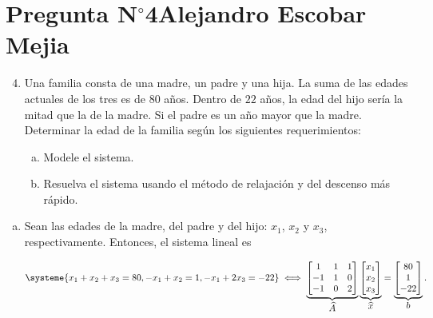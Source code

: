 \section{Pregunta N$^{\circ}$4\qquad Alejandro Escobar Mejia}

\begin{frame}
	\begin{enumerate}\setcounter{enumi}{3}
		\item

		      Una familia consta de una madre, un padre y una hija.
		      La suma de las edades actuales de los tres es de $80$ años.
		      Dentro de $22$ años, la edad del hijo sería la mitad que la
		      de la madre.
		      Si el padre es un año mayor que la madre.
		      Determinar la edad de la familia según los siguientes
		      requerimientos:

		      \begin{enumerate}[a)]
			      \item

			            Modele el sistema.

			      \item

			            Resuelva el sistema usando el método de relajación
			            y del descenso más rápido.
		      \end{enumerate}
	\end{enumerate}

	\begin{solution}
		\begin{enumerate}[a)]
			\item

			      Sean las edades de la \alert{madre}, del \alert{padre} y
			      del \alert{hijo}: \alert{$x_{1}$}, \alert{$x_{2}$} y
			      \alert{$x_{3}$}, respectivamente.
			      Entonces, el sistema lineal es

			      \begin{equation*}
				      \systeme{
				      x_{1}+x_{2}+x_{3}=80,
				      -x_{1}+x_{2}=1,
				      -x_{1}+2x_{3}=-22
				      }\iff
				      \underbrace{
					      \begin{bmatrix}
						      1  & 1 & 1 \\
						      -1 & 1 & 0 \\
						      -1 & 0 & 2
					      \end{bmatrix}
				      }_{\displaystyle\widehat{A}}
				      \underbrace{
					      \begin{bmatrix}
						      x_{1} \\
						      x_{2} \\
						      x_{3}
					      \end{bmatrix}
				      }_{\displaystyle\widehat{x}}
				      =
				      \underbrace{
					      \begin{bmatrix}
						      80 \\
						      1  \\
						      -22
					      \end{bmatrix}
				      }_{\displaystyle b}.
			      \end{equation*}


\end{enumerate}
\end{solution}
\end{frame}
